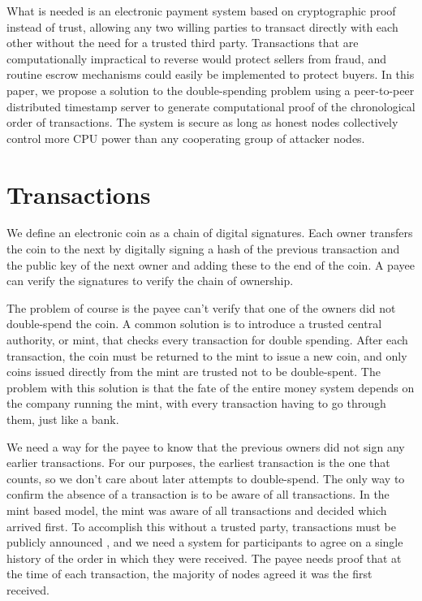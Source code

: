 \documentclass{article}
\begin{document}
What is needed is an electronic payment system based on cryptographic proof instead of trust, allowing any two willing parties to transact directly with each other without the need for a trusted third party.
Transactions that are computationally impractical to reverse would protect sellers from fraud, and routine escrow mechanisms could easily be implemented to protect buyers.
In this paper, we propose a solution to the double-spending problem using a peer-to-peer distributed timestamp server to generate computational proof of the chronological order of transactions.
The system is secure as long as honest nodes collectively control more CPU power than any cooperating group of attacker nodes.


\section{Transactions}\label{sec:transactions}
We define an electronic coin as a chain of digital signatures.
Each owner transfers the coin to the next by digitally signing a hash of the previous transaction and the public key of the next owner and adding these to the end of the coin.
A payee can verify the signatures to verify the chain of ownership.

\begin{center}
\scalebox{0.75}
{}
\end{center}

The problem of course is the payee can't verify that one of the owners did not double-spend the coin.
A common solution is to introduce a trusted central authority, or mint, that checks every transaction for double spending.
After each transaction, the coin must be returned to the mint to issue a new coin, and only coins issued directly from the mint are trusted not to be double-spent.
The problem with this solution is that the fate of the entire money system depends on the company running the mint, with every transaction having to go through them, just like a bank.

We need a way for the payee to know that the previous owners did not sign any earlier transactions.
For our purposes, the earliest transaction is the one that counts, so we don't care about later attempts to double-spend.
The only way to confirm the absence of a transaction is to be aware of all transactions.
In the mint based model, the mint was aware of all transactions and decided which arrived first. To accomplish this without a trusted party, transactions must be publicly announced \cite{dai1998money}, and we need a system for participants to agree on a single history of the order in which they were received.
The payee needs proof that at the time of each transaction, the majority of nodes agreed it was the first received.
\end{document}
